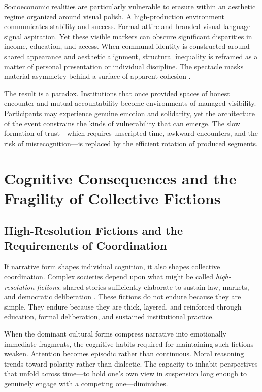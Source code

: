 \documentclass[11pt]{article}
\begin{document}
Socioeconomic realities are particularly vulnerable to erasure within an aesthetic regime organized around visual polish. A high-production environment communicates stability and success. Formal attire and branded visual language signal aspiration. Yet these visible markers can obscure significant disparities in income, education, and access. When communal identity is constructed around shared appearance and aesthetic alignment, structural inequality is reframed as a matter of personal presentation or individual discipline. The spectacle masks material asymmetry behind a surface of apparent cohesion \citep{Bourdieu1984}.

The result is a paradox. Institutions that once provided spaces of honest encounter and mutual accountability become environments of managed visibility. Participants may experience genuine emotion and solidarity, yet the architecture of the event constrains the kinds of vulnerability that can emerge. The slow formation of trust---which requires unscripted time, awkward encounters, and the risk of misrecognition---is replaced by the efficient rotation of produced segments.

\section{Cognitive Consequences and the Fragility of Collective Fictions}
\label{sec:cognitive}

\subsection{High-Resolution Fictions and the Requirements of Coordination}

If narrative form shapes individual cognition, it also shapes collective coordination. Complex societies depend upon what might be called \emph{high-resolution fictions}: shared stories sufficiently elaborate to sustain law, markets, and democratic deliberation \citep{Harari2015}. These fictions do not endure because they are simple. They endure because they are thick, layered, and reinforced through education, formal deliberation, and sustained institutional practice.

When the dominant cultural forms compress narrative into emotionally immediate fragments, the cognitive habits required for maintaining such fictions weaken. Attention becomes episodic rather than continuous. Moral reasoning trends toward polarity rather than dialectic. The capacity to inhabit perspectives that unfold across time---to hold one's own view in suspension long enough to genuinely engage with a competing one---diminishes.
\end{document}
